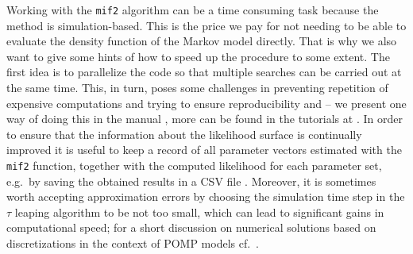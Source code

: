 Working with the \texttt{mif2} algorithm can be a time consuming task because the method is simulation-based. This is the price we pay for not needing to be able to evaluate the density function of the Markov model directly. That is  why we also want to give some hints of how to speed up the procedure to some extent. The first idea is to parallelize the code so that multiple searches can be carried out at the same time. This, in turn,  poses some challenges in preventing repetition of expensive computations and trying to ensure reproducibility and -- we present one way of doing this  in the manual \cite{theresa_git}, more can be found in the tutorials at \cite{King2017}.
In order to ensure that the information about the likelihood surface is 
 continually improved it is useful to keep a record of all parameter vectors estimated with the \texttt{mif2} function, together with the computed likelihood for each parameter set,
e.g.\ by saving the obtained results in a CSV file \citep{King2017}.
 Moreover, it is sometimes worth accepting approximation errors by choosing the simulation time step in the $\tau$ leaping algorithm to be not too small, which can lead to significant gains in computational speed; for a short discussion on  numerical solutions based on discretizations in the context of POMP models cf.\ \cite{breto}. 
